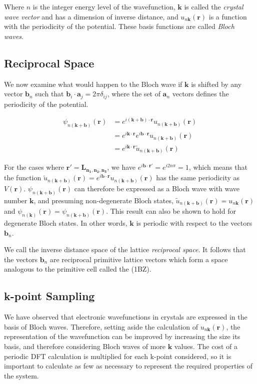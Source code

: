 Where $n$ is the integer energy level of the wavefunction, $\bm{k}$ is called the \textit{crystal wave vector} and has a dimension of inverse distance, and $u_{n\bm{k}}(\bm{r})$ is a function with the periodicity of the potential. These basis functions are called \textit{Bloch waves}.


\subsection{Reciprocal Space}

We now examine what would happen to the Bloch wave if $\bm{k}$ is shifted by any vector $\bm{b}_n$ such that $\bm{b}_i\cdot\bm{a}_j=2\pi\delta_{ij}$, where the set of $\bm{a}_n$ vectors defines the periodicity of the potential.

\begin{equation}
    \begin{split}
        \psi_{n(\bm{k}+\bm{b})}(\bm{r}) &= e^{i(\bm{k}+\bm{b})\cdot\bm{r}} u_{n(\bm{k}+\bm{b})}(\bm{r})\\
        &= e^{i\bm{k}\cdot\bm{r}} e^{i\bm{b}\cdot\bm{r}} u_{n(\bm{k}+\bm{b})}(\bm{r})\\
        &= e^{i\bm{k}\cdot\bm{r}} \tilde{u}_{n(\bm{k}+\bm{b})}(\bm{r})
    \end{split}
\end{equation}

For the cases where $\bm{r}' = \bm{L_{n_1,n_2,n_3}}$, we have $e^{i\bm{b}\cdot\bm{r}'}=e^{i2n\pi}=1$, which means that the function $\tilde{u}_{n(\bm{k}+\bm{b})}(\bm{r}) = e^{i\bm{b}\cdot\bm{r}} u_{n(\bm{k}+\bm{b})}(\bm{r})$ has the same periodicity as $V(\bm{r})$. $\psi_{n(\bm{k}+\bm{b})}(\bm{r})$ can therefore be expressed as a Bloch wave with wave number $\bm{k}$, and presuming non-degenerate Bloch states, $\tilde{u}_{n(\bm{k}+\bm{b})}(\bm{r}) = u_{n\bm{k}}(\bm{r})$ and $\psi_{n(\bm{k})}(\bm{r}) = \psi_{n(\bm{k}+\bm{b})}(\bm{r})$. This result can also be shown to hold for degenerate Bloch states. In other words, $\bm{k}$ is periodic with respect to the vectors $\bm{b}_n$.

We call the inverse distance space of the lattice \textit{reciprocal space}. It follows that the vectors $\bm{b}_n$ are reciprocal primitive lattice vectors which form a space analogous to the primitive cell called the  (1BZ).

\subsection{k-point Sampling}
We have observed that electronic wavefunctions in crystals are expressed in the basis of Bloch waves. Therefore, setting aside the calculation of $u_{n\bm{k}}(\bm{r})$, the representation of the wavefunction can be improved by increasing the size its basis, and therefore considering Bloch waves of more $\bm{k}$ values. The cost of a periodic DFT calculation is multiplied for each k-point considered, so it is important to calculate as few as necessary to represent the required properties of the system.

